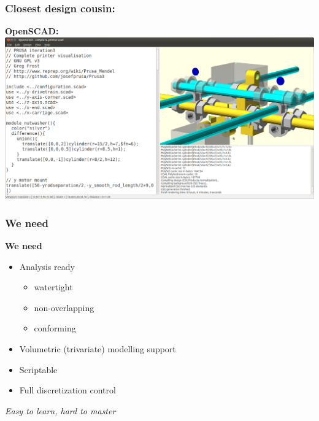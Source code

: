 \documentclass{beamer}
\theoremstyle{plain}
\theoremstyle{definition}
\begin{document}

\begin{frame}[fragile]
\frametitle{Closest design cousin:}
\textbf{OpenSCAD:}
\includegraphics[width=0.9\linewidth]{openscad}

\end{frame}


\begin{frame}
\frametitle{We need}
\textbf{We need}

\begin{itemize}
    \item Analysis ready
    \begin{itemize}
        \item watertight
        \item non-overlapping
        \item conforming
    \end{itemize}
    \item Volumetric (trivariate) modelling support
    \item Scriptable
    \item Full discretization control
\end{itemize}
\pause
\vspace{1cm}
\textit{Easy to learn, hard to master}

\end{frame}

\end{document}
